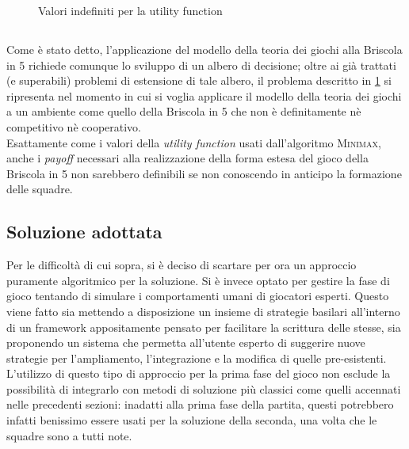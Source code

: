 \begin{figure}[!htbp]

\caption{Valori indefiniti per la utility function}
\label{alberoutility}
\end{figure}

\subsection*{}

Come è stato detto, l'applicazione del modello della teoria dei giochi alla Briscola in 5 richiede comunque lo sviluppo di un albero di decisione; oltre ai già trattati (e superabili) problemi di estensione di tale albero, il problema descritto in \ref{alberoutility} si ripresenta nel momento in cui si voglia applicare il modello della teoria dei giochi a un ambiente come quello della Briscola in 5 che non è definitamente nè competitivo nè cooperativo.\\
Esattamente come i valori della \emph{utility function} usati dall'algoritmo \textsc{Minimax}, anche i \emph{payoff} necessari alla realizzazione della forma estesa del gioco della Briscola in 5 non sarebbero definibili se non conoscendo in anticipo la formazione delle squadre.


\subsection{Soluzione adottata}

Per le difficoltà di cui sopra, si è deciso di scartare per ora un approccio puramente algoritmico per la soluzione.
Si è invece optato per gestire la fase di gioco tentando di simulare i comportamenti umani di giocatori esperti.
Questo viene fatto sia mettendo a disposizione un insieme di strategie basilari all'interno di un framework appositamente pensato per facilitare la scrittura delle stesse, sia proponendo un sistema che permetta all'utente esperto di suggerire nuove strategie per l'ampliamento, l'integrazione e la modifica di quelle pre-esistenti.\\
L'utilizzo di questo tipo di approccio per la prima fase del gioco non esclude la possibilità di integrarlo con metodi di soluzione più classici come quelli accennati nelle precedenti sezioni: inadatti alla prima fase della partita, questi potrebbero infatti benissimo essere usati per la soluzione della seconda, una volta che le squadre sono a tutti note.
